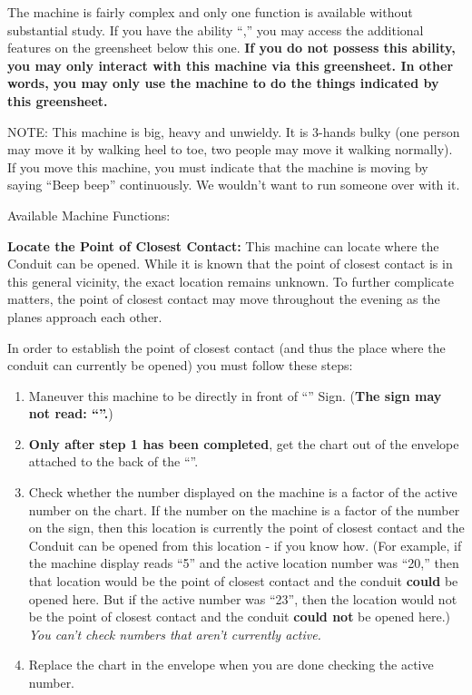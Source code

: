\documentclass[green]{elementals}
\begin{document}
\name{\gConduitCover{}}


The machine is fairly complex and only one function is available without substantial study. If you have the ability ``\aWorkConduit{},'' you may access the additional features on the greensheet below this one. {\bf If you do not possess this ability, you may only interact with this machine via this greensheet. In other words, you may only use the machine to do the things indicated by this greensheet.}

NOTE: This machine is big, heavy and unwieldy. It is 3-hands bulky (one person may move it by walking heel to toe, two people may move it walking normally). If you move this machine, you must indicate that the machine is moving by saying ``Beep beep'' continuously. We wouldn't want to run someone over with it.


{\large Available Machine Functions:}


{\bf Locate the Point of Closest Contact:}
This machine can locate where the Conduit can be opened. While it is known that the point of closest contact is in this general vicinity, the exact location remains unknown. To further complicate matters, the point of closest contact may move throughout the evening as the planes approach each other.

In order to establish the point of closest contact (and thus the place where the conduit can currently be opened) you must follow these steps:
\begin{enumerate}
  \item Maneuver this machine to be directly in front of ``\sLocationCoverSheet{}'' Sign. ({\bf The sign may not read: ``\sSealedLocationSheet{}''.})
  \item {\bf Only after step 1 has been completed}, get the chart out of the envelope attached to the back of the ``\sLocationCoverSheet{}''.
  \item Check whether the number displayed on the machine is a factor of the active number on the chart. If the number on the machine is a factor of the number on the sign, then this location is currently the point of closest contact and the Conduit can be opened from this location - if you know how. (For example, if the machine display reads ``5'' and the active location number was ``20,'' then that location would be the point of closest contact and the conduit {\bf could} be opened here. But if the active number was ``23'', then the location would not be the point of closest contact and the conduit {\bf could not} be opened here.) \emph{You can't check numbers that aren't currently active.} 
  \item Replace the chart in the envelope when you are done checking the active number.
\end{enumerate}
\end{document}

